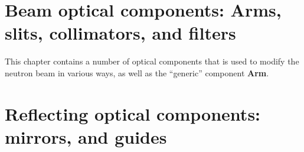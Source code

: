 
\chapter{Beam optical components:
Arms, slits, collimators, and filters}
This chapter contains a number of optical components
that is used to modify the neutron beam in various ways,
as well as the ``generic'' component {\bf Arm}.









\newpage




\newpage
\chapter{Reflecting optical components: mirrors, and guides}




% 
% 
% 
% 
% 
% 
% 
% 
% 

\newpage

